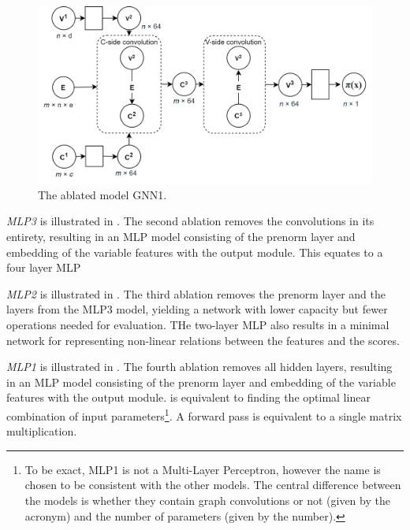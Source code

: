 \begin{figure}
    \centering
    \includegraphics[width=\linewidth]{img/gnn_2.png}
    \caption{The ablated model GNN1.}
    \label{fig:gnn1}
\end{figure}

\textit{\gls{MLP}3} is illustrated in . The second ablation removes the convolutions in its entirety, resulting in an \gls{MLP} model consisting of the prenorm layer and embedding of the variable features with the output module. This equates to a four layer \gls{MLP}


\textit{\gls{MLP}2} is illustrated in . The third ablation removes the prenorm layer and the layers from the MLP3 model, yielding a network with lower capacity but fewer operations needed for evaluation. THe two-layer \gls{MLP} also results in a minimal network for representing non-linear relations between the features and the scores. 


\textit{\gls{MLP}1} is illustrated in . The fourth ablation removes all hidden layers, resulting in an \gls{MLP} model consisting of the prenorm layer and embedding of the variable features with the output module. is equivalent to finding the optimal linear combination of input parameters\footnote{To be exact, MLP1 is not a Multi-Layer Perceptron, however the name is chosen to be consistent with the other models. The central difference between the models is whether they contain graph convolutions or not (given by the acronym) and the number of parameters (given by the number).}. A forward pass is equivalent to a single matrix multiplication. 


